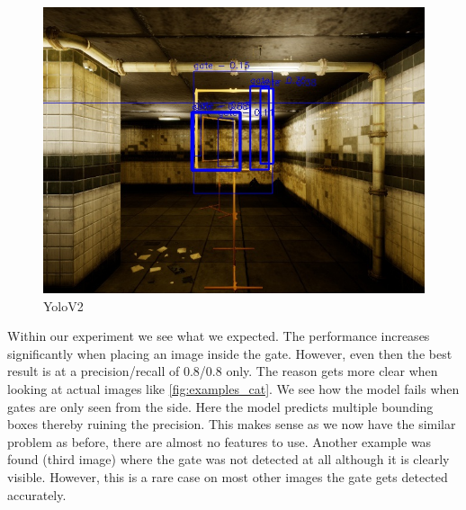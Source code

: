 \documentclass{article}
\begin{document}
\begin{figure}
	\begin{minipage}{0.3\textwidth}
		\includegraphics[width=\textwidth]{fig/v23}
	\end{minipage}
	\caption{YoloV2}
	\label{fig:examples}
\end{figure}

Within our experiment we see what we expected. The performance increases significantly when placing an image inside the gate. However, even then the best result is at a precision/recall of 0.8/0.8 only. The reason gets more clear when looking at actual images like \autoref{fig:examples_cat}. We see how the model fails when gates are only seen from the side. Here the model predicts multiple bounding boxes thereby ruining the precision. This makes sense as we now have the similar problem as before, there are almost no features to use. Another example was found (third image) where the gate was not detected at all although it is clearly visible. However, this is a rare case on most other images the gate gets detected accurately.
\end{document}
